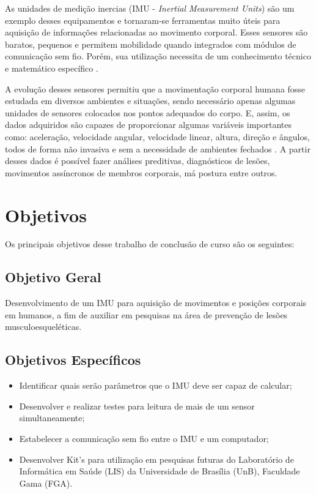 As unidades de medição inercias (IMU - \textit{Inertial Measurement Units}) são um exemplo desses equipamentos e tornaram-se ferramentas muito úteis para aquisição de informações relacionadas ao movimento corporal. Esses sensores são baratos, pequenos e permitem mobilidade quando integrados com módulos de comunicação sem fio. Porém, sua utilização necessita de um conhecimento técnico e matemático específico \cite{ober2015}.

A evolução desses sensores permitiu que a movimentação corporal humana fosse estudada em diversos ambientes e situações, sendo necessário apenas algumas unidades de sensores colocados nos pontos adequados do corpo. E, assim, os dados adquiridos são capazes de proporcionar algumas variáveis importantes como: aceleração, velocidade angular, velocidade linear, altura, direção e ângulos, todos de forma não invasiva e sem a necessidade de ambientes fechados \cite{chang2016}. A partir desses dados é possível fazer análises preditivas, diagnósticos de lesões, movimentos assíncronos de membros corporais, má postura entre outros.



\section{Objetivos}

Os principais objetivos desse trabalho de conclusão de curso são os seguintes:

\subsection{Objetivo Geral}

Desenvolvimento de um IMU para aquisição de movimentos e posições corporais em humanos, a fim de auxiliar em pesquisas na área de prevenção de lesões musculoesqueléticas.

\subsection {Objetivos Específicos} 
 \begin{itemize} 
		\item Identificar quais serão parâmetros que o IMU deve ser capaz de calcular;
		
		\item Desenvolver e realizar testes para leitura de mais de um sensor simultaneamente;
		
		
		\item Estabelecer a comunicação sem fio entre o IMU e um computador;
		
		\item Desenvolver Kit's para utilização em pesquisas futuras do Laboratório de Informática em Saúde (LIS) da Universidade de Brasília (UnB), Faculdade Gama (FGA).
		
		
	\end{itemize}
